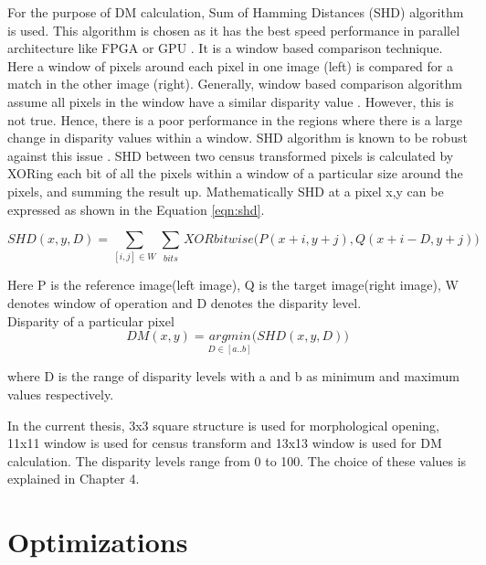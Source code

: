 For the purpose of DM calculation, Sum of Hamming Distances (SHD) algorithm is used. This algorithm is chosen as it has the best speed performance in parallel architecture like FPGA or GPU \cite{GyorgyTamasBiroKaroly-Agoston2015}. It is a window based comparison technique. Here a window of pixels around each pixel in one image (left) is compared for a match in the other image (right). Generally, window based comparison algorithm assume all pixels in the window have a similar disparity value \cite{Hamzah2015}. However, this is not true. Hence, there is a poor performance in the regions where there is a large change in disparity values within a window. SHD algorithm is known to be robust against this issue \cite{Hamzah2015}. SHD between two census transformed pixels is calculated by XORing each bit of all the pixels within a window of a particular size around the pixels, and summing the result up. Mathematically SHD at a pixel x,y can be expressed as shown in the Equation \ref{eqn:shd}.

\begin{equation}
  SHD(x,y,D) = \underset{[i,j]\in W}{\sum} {{\sum_{\substack{bits}}}XORbitwise\big(P(x+i,y+j),Q(x+i-D,y+j)\big)} 
  \label{eqn:shd}
\end{equation}

Here P is the reference image(left image), Q is the target image(right image), W denotes window of operation and D denotes the disparity level.\\
Disparity of a particular pixel
\begin{equation}
  DM(x,y) = \underset{D\in [a..b]}{argmin}{\big(SHD(x,y,D)\big)}
  \label{eqn:dm}
\end{equation}

where D is the range of disparity levels with a and b as minimum and maximum values respectively.

In the current thesis, 3x3 square structure is used for morphological opening, 11x11 window is used for census transform and 13x13 window is used for DM calculation. The disparity levels range from 0 to 100. The choice of these values is explained in Chapter 4.


\section{Optimizations}
\label{sec:optimizations}

